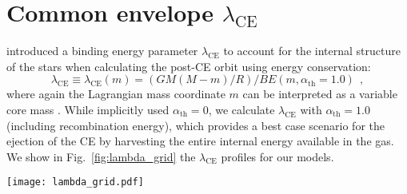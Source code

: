 \documentclass[twocolumn,twocolappendix,trackchanges]{aastex63}
\DeclareRobustCommand{\Figref}[1]{Fig.~\ref{#1}}
\begin{document}
\section{Common envelope $\lambda_\mathrm{CE}$}
\label{sec:pop_synth_app}

\cite{dekool:1990} introduced a binding energy parameter
$\lambda_\mathrm{CE}$ to account for the internal structure of the
stars when calculating the post-CE orbit using energy conservation:
\begin{equation}
  \label{eq:lambda}
  \lambda_\mathrm{CE} \equiv \lambda_\mathrm{CE}(m) = (GM(M-m)/R)/BE(m, \alpha_\mathrm{th}=1.0) \ \ ,
\end{equation}
where again the Lagrangian mass coordinate $m$ can be interpreted as a
variable core mass \citep[see also][]{demarco:11, ivanova:2013}. While
\cite{dekool:1990} implicitly used
  $\alpha_\mathrm{th}=0$, we calculate $\lambda_\mathrm{CE}$ with
  $\alpha_\mathrm{th}=1.0$ (including recombination energy), which provides a best case scenario for
  the ejection of the CE by harvesting the entire internal energy
  available in the gas. We show
in \Figref{fig:lambda_grid} the $\lambda_\mathrm{CE}$ profiles for our models.

\begin{figure*}[htbp]
  \centering
  \texttt{[image: lambda\_grid.pdf]}
  \caption{Profile of the binding energy parameter
    $\lambda_\mathrm{CE}$ as a function of mass coordinate for
    accretors (orange), single stars (red), and our engineered stars
    (other colors) at selected total radii. The vertical lines mark
    the outer edge of the helium cores of the accretor and single
    star, that is the outermost location where $Y>0.1$ and $X<0.01$
    (solid lines), or $X<0.1$ (dashed), or $X<0.2$
    (dot-dashed). \textcolor{blue}{The CEB size of engineered models
      increases from blue to yellow.}}
  \label{fig:lambda_grid}
\end{figure*}
\end{document}
